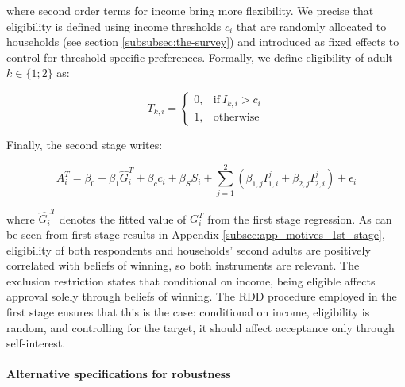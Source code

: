 \documentclass[12pt]{article} %
\begin{document}
\noindent
where second order terms for income bring more flexibility. We precise that eligibility is defined using income thresholds $c_i$ that are randomly allocated to households (see section \ref{subsubsec:the-survey}) and introduced as fixed effects to control for threshold-specific preferences. Formally, we define eligibility of adult $k\in \{1;2\}$ as:

\begin{equation}
T_{k,i} =
\begin{cases}
  0, & \text{if}\ I_{k,i} > c_i \\
  1, & \text{otherwise}
\end{cases}
\end{equation}

\medskip

\noindent
Finally, the second stage writes:

\begin{equation}
    A_i^T = \beta_0 + \beta_1 \widehat{G}_i^T + \beta_c c_i + \beta_S S_i + \sum_{j=1}^2 \left( \beta_{1,j} I_{1,i}^j + \beta_{2,j} I_{2,i}^j \right) + \epsilon_i
    \label{eq:second_stage_with_rdd_approve_winner}
\end{equation}

\medskip

\noindent
where $\widehat{G_i}^T$ denotes the fitted value of $G_i^T$ from the first stage regression. As can be seen from first stage results in Appendix \ref{subsec:app_motives_1st_stage}, eligibility of both respondents and households' second adults are positively correlated with beliefs of winning, so both instruments are relevant. The exclusion restriction states that conditional on income, being eligible affects approval solely through beliefs of winning. The RDD procedure employed in the first stage ensures that this is the case: conditional on income, eligibility is random, and controlling for the target, it should affect acceptance only through self-interest.

\paragraph{Alternative specifications for robustness}
\end{document}
